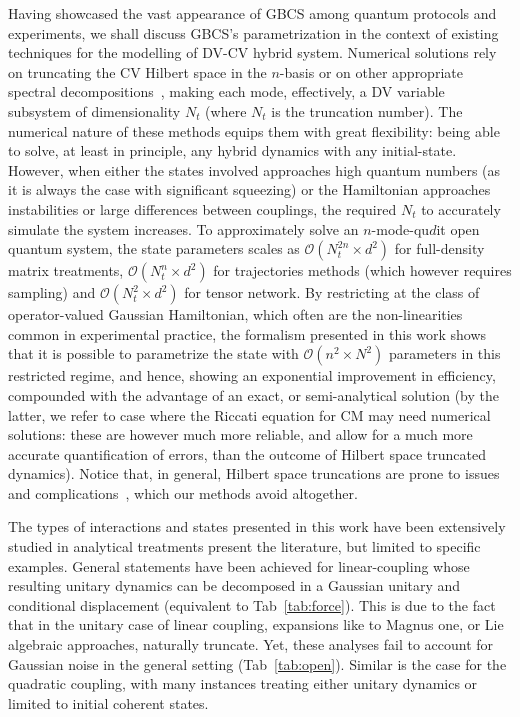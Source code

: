 \documentclass[%
reprint,
superscriptaddress,
nofootinbib,
 amsmath,amssymb,
prx,
floatfix,
]{revtex4-2}
\begin{document}
Having showcased the vast appearance of GBCS among quantum protocols and experiments, we shall discuss GBCS's parametrization in the context of existing techniques for the modelling of DV-CV hybrid system. Numerical solutions rely on truncating the CV Hilbert space in the $n$-basis or on other appropriate spectral decompositions~\cite{jaynes_comparison_1963,Braak_Integrability_2011,chen_exact_2012,Batchelor_integrability_2015}, making each mode, effectively, a DV variable subsystem of dimensionality $N_t$ (where $N_t$ is the truncation number). The numerical nature of these methods equips them with great flexibility: being able to solve, at least in principle, any hybrid dynamics with any initial-state. However, when either the states involved approaches high quantum numbers (as it is always the case with significant squeezing) or the Hamiltonian approaches instabilities or large differences between couplings, the required $N_t$ to accurately simulate the system increases. To approximately solve an $n$-mode-qu$d$it open quantum system, the state parameters scales as $\mathcal{O}( N_t^{2 n} \times d^2)$ for full-density matrix treatments, $\mathcal{O}( N_t^{n} \times d^2)$ for trajectories methods (which however requires sampling) and $\mathcal{O}( N_t^{2} \times d^2)$ for tensor network. By restricting at the class of operator-valued Gaussian Hamiltonian, which often are the non-linearities common in experimental practice, the formalism presented in this work shows that it is possible to parametrize the state with $\mathcal{O}( n^2 \times N^2)$ parameters in this restricted regime, and hence, showing an exponential improvement in efficiency, compounded with the advantage of an exact, or semi-analytical solution (by the latter, we refer to case where the Riccati equation for CM may need numerical solutions: these are however much more reliable, and allow for a much more accurate quantification of errors, than the outcome of Hilbert space truncated dynamics). Notice that, in general, Hilbert space truncations are prone to issues and complications~\cite{ashhab26}, which our methods avoid altogether. 

The types of interactions and states presented in this work have been extensively studied in analytical treatments present the literature, but limited to specific examples. General statements have been achieved for linear-coupling whose resulting unitary dynamics can be decomposed in a Gaussian unitary and conditional displacement (equivalent to Tab~\ref{tab:force}). This is due to the fact that in the unitary case of linear coupling, expansions like to Magnus one, or Lie algebraic approaches, naturally truncate. Yet, these analyses fail to account for Gaussian noise in the general setting (Tab~\ref{tab:open}).  Similar is the case for the quadratic coupling, with many instances treating either unitary dynamics or limited to initial coherent states.
\end{document}

